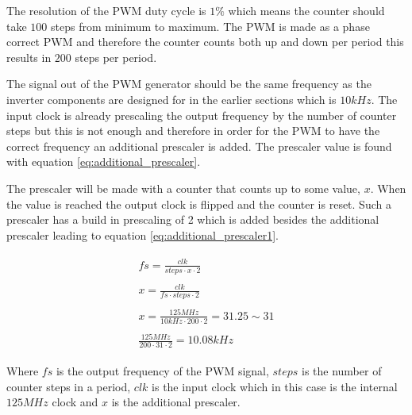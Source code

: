 The resolution of the PWM duty cycle is $1\%$ which means the counter should take $100$ steps from minimum to maximum. The PWM is made as a phase correct PWM and therefore the counter counts both up and down per period this results in $200$ steps per period. 

The signal out of the PWM generator should be the same frequency as the inverter components are designed for in the earlier sections which is $10kHz$. The input clock is already prescaling the output frequency by the number of counter steps but this is not enough and therefore in order for the PWM to have the correct frequency an additional prescaler is added. The prescaler value is found with equation \ref{eq:additional_prescaler}.

The prescaler will be made with a counter that counts up to some value, $x$. When the value is reached the output clock is flipped and the counter is reset. Such a prescaler has a build in prescaling of 2 which is added besides the additional prescaler leading to equation \ref{eq:additional_prescaler1}.



\begin{subequations}
    \begin{align}
        \begin{split}
            fs = \frac{clk}{steps \cdot x \cdot 2}
            \label{eq:additional_prescaler1}
        \end{split} \\ 
        \begin{split}
             x = \frac{clk}{fs \cdot steps \cdot 2}
        \end{split} \\ 
        \begin{split}
            x = \frac{125MHz}{10kHz \cdot 200 \cdot 2} = 31.25 \sim 31
            \label{eq:additional_prescaler}
        \end{split} \\
        \begin{split}
            \frac{125MHz}{200 \cdot 31 \cdot 2} = 10.08kHz
        \end{split}
    \end{align}
\end{subequations}

Where $fs$ is the output frequency of the PWM signal, $steps$ is the number of counter steps in a period, $clk$ is the input clock which in this case is the internal $125MHz$ clock and $x$ is the additional prescaler.


